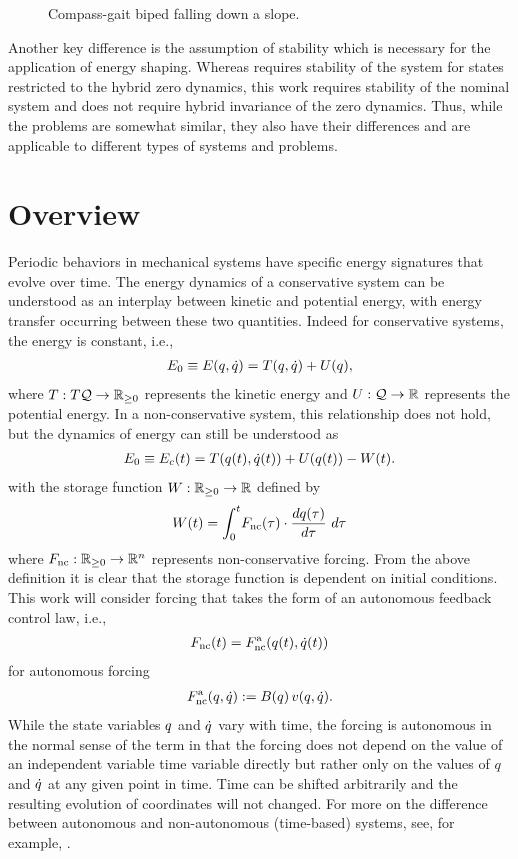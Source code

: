 \begin{figure}
  \centering
  \def\svgwidth{.5\columnwidth}
  
  \caption{Compass-gait biped falling down a slope.}
  \label{fig:compass_gait_slope_model}
\end{figure}

Another key difference is the assumption of stability which is necessary for the
application of energy shaping.
%
Whereas \cite{Ames2014} requires stability of the system for states restricted
to the hybrid zero dynamics, this work requires stability of the nominal system
and does not require hybrid invariance of the zero dynamics.
%
Thus, while the problems are somewhat similar, they also have their differences
and are applicable to different types of systems and problems.

\section{Overview}

Periodic behaviors in mechanical systems have specific energy signatures that
evolve over time.
%
The energy dynamics of a conservative system can be understood as an interplay
between kinetic and potential energy, with energy transfer occurring between
these two quantities.
%
Indeed for conservative systems, the energy is constant, i.e.,
\begin{align*}
  E_{0} \equiv E(q, \dot{q}) = T(q, \dot{q}) + U(q),
\end{align*}
where $T : T\mathcal{Q} \to \mathbb{R}_{\geq 0}$ represents the kinetic energy and $U : \mathcal{Q} \to \mathbb{R}$
represents the potential energy.
%
In a non-conservative system, this relationship does not hold, but the dynamics
of energy can still be understood as
\begin{align}
  \label{eq:ncsys-nrg-cons}
  E_{0} \equiv E_{c}(t) = T(q(t), \dot{q}(t)) + U(q(t)) - W(t).
\end{align}
with the storage function $W : \mathbb{R}_{\geq 0} \to \mathbb{R}$ defined by
\begin{align}
  \label{eq:storage-function-Fnc}
  \W\argt = \int_{0}^{t} \! \Fnc\argtau \cdot \frac{d\q\argtau}{d\tau} \ d\tau
\end{align}
where $F_{\mathrm{nc}}: \mathbb{R}_{\geq 0} \to \mathbb{R}^{n}$ represents non-conservative forcing.
%
From the above definition it is clear that the storage function is dependent on
initial conditions.
%
This work will consider forcing that takes the form of an autonomous feedback
control law, i.e.,
\begin{align*}
  F_{\mathrm{nc}}(t) = F_{\mathrm{nc}}^{\mathrm{a}}(q(t), \dot{q}(t))
\end{align*}
for autonomous forcing
\begin{align*}
  F_{\mathrm{nc}}^{\mathrm{a}}(q, \dot{q}) := B(q) \, v(q, \dot{q}).
\end{align*}
%
While the state variables $q$ and $\dot{q}$ vary with time, the forcing is
autonomous in the normal sense of the term in that the forcing does not depend
on the value of an independent variable time variable directly but rather only
on the values of $q$ and $\dot{q}$ at any given point in time.
%
Time can be shifted arbitrarily and the resulting evolution of coordinates will
not changed.
%
For more on the difference between autonomous and non-autonomous (time-based)
systems, see, for example, \cite[pp.~63]{Perko2001}.

